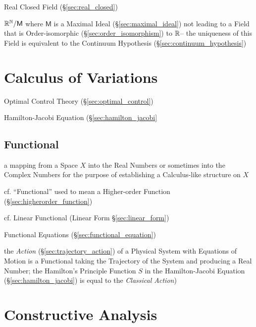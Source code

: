 Real Closed Field (\S\ref{sec:real_closed})

$\mathbb{R}^{\mathbb{N}} / \mathsf{M}$ where $\mathsf{M}$ is a Maximal Ideal
(\S\ref{sec:maximal_ideal}) not leading to a Field that is
Order-isomorphic (\S\ref{sec:order_isomorphism}) to $\mathbb{R}$-- the
uniqueness of this Field is equivalent to the Continuum Hypothesis
(\S\ref{sec:continuum_hypothesis})



\section{Calculus of Variations}\label{sec:calculus_of_variations}

\fist Optimal Control Theory (\S\ref{sec:optimal_control})

Hamilton-Jacobi Equation (\S\ref{sec:hamilton_jacobi}



\subsection{Functional}\label{sec:functional}

a mapping from a Space $X$ into the Real Numbers or sometimes into the Complex
Numbers for the purpose of establishing a Calculus-like structure on $X$

\fist cf. ``Functional'' used to mean a Higher-order Function
(\S\ref{sec:higherorder_function})

\fist cf. Linear Functional (Linear Form \S\ref{sec:linear_form})

\fist Functional Equations (\S\ref{sec:functional_equation})

the \emph{Action} (\S\ref{sec:trajectory_action}) of a Physical System with
Equations of Motion is a Functional taking the Trajectory of the System and
producing a Real Number; the Hamilton's Principle Function $S$ in the
Hamilton-Jacobi Equation (\S\ref{sec:hamilton_jacobi}) is equal to the
\emph{Classical Action})



\section{Constructive Analysis}\label{sec:constructive_analysis}

